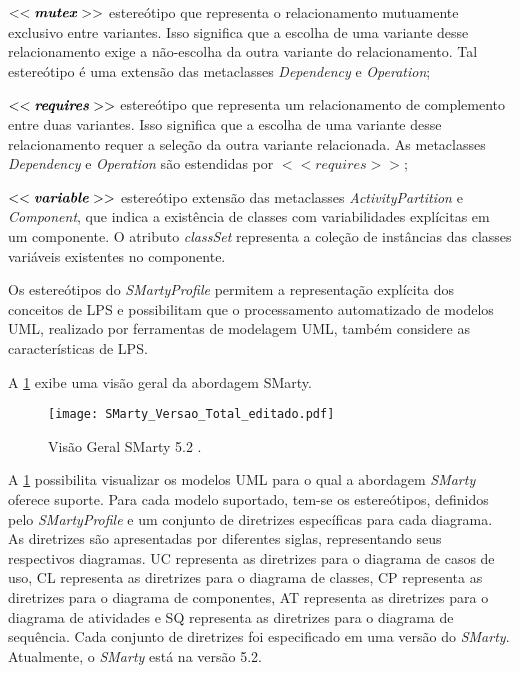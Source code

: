 $<<\textbf{\textit{mutex}}>>$ estereótipo que representa o relacionamento mutuamente exclusivo entre variantes. Isso significa que a escolha de uma variante desse relacionamento exige a não-escolha da outra variante do relacionamento. Tal estereótipo é uma extensão das metaclasses \textit{Dependency} e \textit{Operation};

$<<\textbf{\textit{requires}}>>$ estereótipo que representa um relacionamento de complemento entre duas variantes. Isso significa que a escolha de uma variante desse relacionamento requer a seleção da outra variante relacionada. As metaclasses \textit{Dependency} e \textit{Operation} são estendidas por $<<\textit{requires}>>$;

$<<\textbf{\textit{variable}}>>$ estereótipo extensão das metaclasses \textit{ActivityPartition} e \textit{Component}, que indica a existência de classes com variabilidades explícitas em um componente. O atributo \textit{classSet} representa a coleção de instâncias das classes variáveis existentes no componente.

Os estereótipos do \textit{SMartyProfile} permitem a representação explícita dos conceitos de LPS e possibilitam que o processamento automatizado de modelos UML, realizado por ferramentas de modelagem UML, também considere as características de LPS.

A \ref{SMartyProfileVersoes} exibe uma visão geral da abordagem SMarty.

\begin{figure}[!htb]
	\centering		
	\caption{Visão Geral SMarty 5.2 \cite{Bera2015}.}	
	\label{SMartyProfileVersoes}
	\texttt{[image: SMarty\_Versao\_Total\_editado.pdf]}
\end{figure}

A \ref{SMartyProfileVersoes} possibilita visualizar os modelos UML para o qual a abordagem \textit{SMarty} oferece suporte. Para cada modelo suportado, tem-se os estereótipos, definidos pelo \textit{SMartyProfile} e um conjunto de diretrizes específicas para cada diagrama. As diretrizes são apresentadas por diferentes siglas, representando seus respectivos diagramas. UC representa as diretrizes para o diagrama de casos de uso, CL representa as diretrizes para o diagrama de classes, CP representa as diretrizes para o diagrama de componentes, AT representa as diretrizes para o diagrama de atividades e SQ representa as diretrizes para o diagrama de sequência. Cada conjunto de diretrizes foi especificado em uma versão do \textit{SMarty}. Atualmente, o \textit{SMarty} está na versão 5.2.

